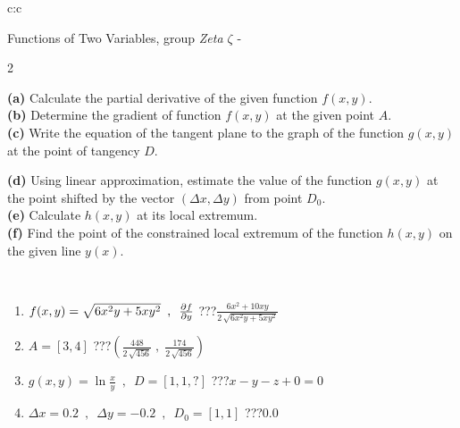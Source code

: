 \documentclass[10pt]{report}
\begin{document}
\begin{tabular}{c:c}
\begin{minipage}[c][104.5mm][t]{0.5\linewidth}
\begin{center}
\vspace{7mm}
{\huge \LARGE Functions of Two Variables, group \textit{Zeta $\zeta$} -}\\[5mm]
\begin{minipage}{0.95\linewidth}
\begin{center}
{\small \begin{multicols}{2} \raggedright
\textbf{(a)} Calculate the partial derivative of the given function \(f(x,y)\). \\[1mm]
\textbf{(b)} Determine the gradient of function \(f(x,y)\) at the given point \(A\). \\[1mm]
\textbf{(c)} Write the equation of the tangent plane to the graph of the function \(g(x,y)\) at the point of tangency \(D\). \par \columnbreak
\textbf{(d)} Using linear approximation, estimate the value of the function \(g(x,y)\) at the point shifted by the vector \((\Delta x, \Delta y)\) from point \(D_0\). \\[1mm]
\textbf{(e)} Calculate \(h(x,y)\) at its local extremum. \\[1mm]
\textbf{(f)} Find the point of the constrained local extremum of the function \(h(x,y)\) on the given line \(y(x)\). \\[1mm]
\end{multicols}
}
\end{center}
\end{minipage}
\\[4mm]
\begin{minipage}{0.79\linewidth}
\begin{center}
\begin{varwidth}{\linewidth}
\begin{enumerate}
\normalsizerr
\item $f(x,y) = \sqrt{6x^2y + 5xy^2}\enspace , \enspace \pdv{f}{y}$\quad \dotfill\; ???\;\dotfill \quad $\frac{6x^2+10xy}{2\,\sqrt{6x^2y+5xy^2}}$
\item $A = [3, 4]$\quad \dotfill\; ???\;\dotfill \quad $\left( \frac{448}{2\,\sqrt{456}} \;,\; \frac{174}{2\,\sqrt{456}} \right)$
\item $g(x,y) = \ln\frac{x}{y} \enspace , \enspace D=[1,1,?]$\quad \dotfill\; ???\;\dotfill \quad $x - y - z + 0 = 0$
\item $\Delta x = {0.2} \enspace,\enspace \Delta y = {-0.2} \enspace,\enspace D_0 = [1,1]$\quad \dotfill\; ???\;\dotfill \quad $0.0$

\end{enumerate}
\end{varwidth}
\end{center}
\end{minipage}
\end{center}
\end{minipage}
\end{tabular}
\end{document}

